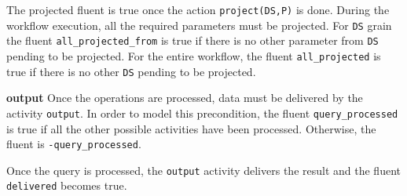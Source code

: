 %



The projected fluent is true once the action \texttt{project(DS,P)} is done. During the workflow execution, all the required parameters must be projected. For \texttt{DS} grain the fluent \texttt{all\_projected\_from} is true if there is no other parameter from \texttt{DS} pending to be projected. For the entire workflow, the fluent \texttt{all\_projected} is true if there is no other \texttt{DS} pending to be projected.
                
%


                    
\textbf{output} Once the operations are processed, data must be delivered by the activity \texttt{output}. In order to model this precondition, the fluent \texttt{query\_processed} is true if all the other possible activities have been processed. Otherwise, the fluent is \texttt{-query\_processed}.

%



Once the query is processed, the \texttt{output} activity delivers the result and the fluent \texttt{delivered} becomes true.

%






